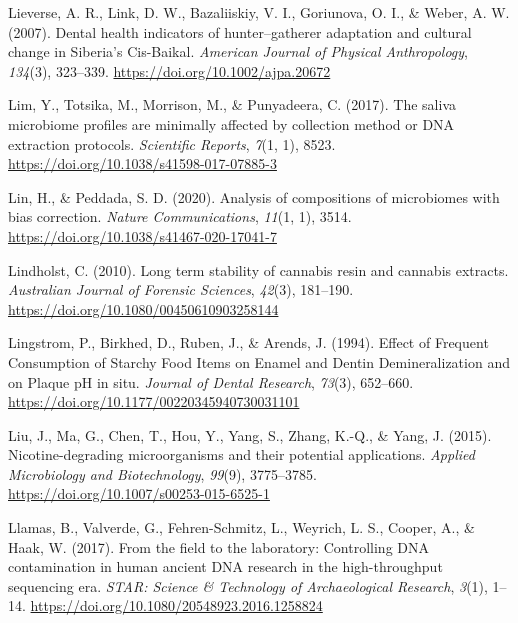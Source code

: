 \documentclass[
  letterpaper,
]{book}
\newlength{\cslhangindent}
\newlength{\cslentryspacingunit} %
\newenvironment{CSLReferences}[2] %
 {%
  \setlength{\parindent}{0pt}
  \ifodd #1
  \let\oldpar\par
  \def\par{\hangindent=\cslhangindent\oldpar}
  \fi
  \setlength{\parskip}{#2\cslentryspacingunit}
 }%
 {}
\begin{document}
\begin{CSLReferences}{1}{0}
\leavevmode{}%
Lieverse, A. R., Link, D. W., Bazaliiskiy, V. I., Goriunova, O. I., \&
Weber, A. W. (2007). Dental health indicators of hunter--gatherer
adaptation and cultural change in {Siberia}'s {Cis-Baikal}.
\emph{American Journal of Physical Anthropology}, \emph{134}(3),
323--339. \url{https://doi.org/10.1002/ajpa.20672}

\leavevmode{}%
Lim, Y., Totsika, M., Morrison, M., \& Punyadeera, C. (2017). The saliva
microbiome profiles are minimally affected by collection method or {DNA}
extraction protocols. \emph{Scientific Reports}, \emph{7}(1, 1), 8523.
\url{https://doi.org/10.1038/s41598-017-07885-3}

\leavevmode{}%
Lin, H., \& Peddada, S. D. (2020). Analysis of compositions of
microbiomes with bias correction. \emph{Nature Communications},
\emph{11}(1, 1), 3514. \url{https://doi.org/10.1038/s41467-020-17041-7}

\leavevmode{}%
Lindholst, C. (2010). Long term stability of cannabis resin and cannabis
extracts. \emph{Australian Journal of Forensic Sciences}, \emph{42}(3),
181--190. \url{https://doi.org/10.1080/00450610903258144}

\leavevmode{}%
Lingstrom, P., Birkhed, D., Ruben, J., \& Arends, J. (1994). Effect of
{Frequent Consumption} of {Starchy Food Items} on {Enamel} and {Dentin
Demineralization} and on {Plaque pH} in situ. \emph{Journal of Dental
Research}, \emph{73}(3), 652--660.
\url{https://doi.org/10.1177/00220345940730031101}

\leavevmode{}%
Liu, J., Ma, G., Chen, T., Hou, Y., Yang, S., Zhang, K.-Q., \& Yang, J.
(2015). Nicotine-degrading microorganisms and their potential
applications. \emph{Applied Microbiology and Biotechnology},
\emph{99}(9), 3775--3785.
\url{https://doi.org/10.1007/s00253-015-6525-1}

\leavevmode{}%
Llamas, B., Valverde, G., Fehren-Schmitz, L., Weyrich, L. S., Cooper,
A., \& Haak, W. (2017). From the field to the laboratory: {Controlling
DNA} contamination in human ancient {DNA} research in the
high-throughput sequencing era. \emph{STAR: Science \& Technology of
Archaeological Research}, \emph{3}(1), 1--14.
\url{https://doi.org/10.1080/20548923.2016.1258824}


\end{CSLReferences}
\end{document}
